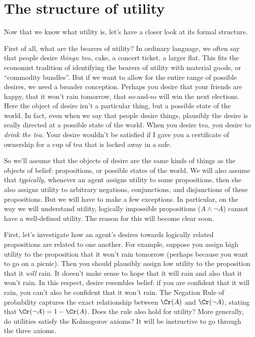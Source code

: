 
\section{The structure of utility}\label{sec:structure-of-utility}

Now that we know what utility is, let's have a closer look at its
formal structure.

First of all, what are the bearers of utility? In ordinary language,
we often say that people desire \emph{things}: tea, cake, a concert
ticket, a larger flat. This fits the economist tradition of
identifying the bearers of utility with material goods, or ``commodity
bundles''. But if we want to allow for the entire range of possible
desires, we need a broader conception. Perhaps you desire that your
friends are happy, that it won't rain tomorrow, that so-and-so will
win the next elections. Here the object of desire isn't a particular
thing, but a possible state of the world. In fact, even when we say
that people desire things, plausibly the desire is really directed at
a possible state of the world. When you desire tea, you desire to
\emph{drink the tea}. Your desire wouldn't be satisfied if I gave you
a certificate of ownership for a cup of tea that is locked away in a
safe.

So we'll assume that the objects of desire are the same kinds of
things as the objects of belief: propositions, or possible states of
the world. We will also assume that \emph{typically}, whenever an
agent assigns utility to some propositions, then she also assigns
utility to arbitrary negations, conjunctions, and disjunctions of
these propositions. But we will have to make a few exceptions. In
particular, on the way we will understand utility, logically impossible
propositions ($A \land \neg A$) cannot have a well-defined
utility. The reason for this will become clear soon.

First, let's investigate how an agent's desires towards logically
related propositions are related to one another. For example, suppose
you assign high utility to the proposition that it won't rain tomorrow
(perhaps because you want to go on a picnic). Then you should
plausibly assign low utility to the proposition that it \emph{will}
rain. It doesn't make sense to hope that it will rain and also that it
won't rain. In this respect, desire resembles belief: if you are
confident that it will rain, you can't also be confident that it won't
rain. The Negation Rule of probability captures the exact relationship
between $\Cr(A)$ and $\Cr(\neg A)$, stating that $\Cr(\neg A) = 1 -
\Cr(A)$. Does the rule also hold for utility?  More generally, do
utilities satisfy the Kolmogorov axioms?  It will be instructive to go
through the three axioms.

